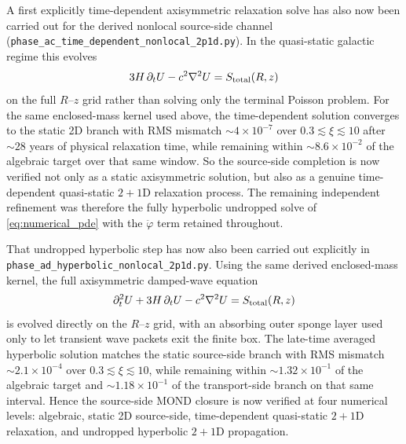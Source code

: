 \documentclass[11pt]{article}
\begin{document}
A first explicitly time-dependent axisymmetric relaxation solve has also now
been carried out for the derived nonlocal source-side channel
(\texttt{phase\_ac\_time\_dependent\_nonlocal\_2p1d.py}).  In the quasi-static
galactic regime this evolves
\[
3H\,\partial_t U-c^2\nabla^2U=S_{\rm total}(R,z)
\]
on the full $R$--$z$ grid rather than solving only the terminal Poisson
problem.  For the same enclosed-mass kernel used above, the time-dependent
solution converges to the static 2D branch with RMS mismatch
$\sim4\times10^{-7}$ over $0.3\lesssim\xi\lesssim10$ after $\sim 28$ years of
physical relaxation time, while remaining within $\sim8.6\times10^{-2}$ of the
algebraic target over that same window.  So the source-side completion is now
verified not only as a static axisymmetric solution, but also as a genuine
time-dependent quasi-static $2+1$D relaxation process.  The remaining
independent refinement was therefore the fully hyperbolic undropped solve of
\eqref{eq:numerical_pde} with the $\ddot{\varphi}$ term retained throughout.

That undropped hyperbolic step has now also been carried out explicitly in
\nolinkurl{phase_ad_hyperbolic_nonlocal_2p1d.py}.  Using the same derived
enclosed-mass kernel, the full axisymmetric damped-wave equation
\[
\partial_t^2 U + 3H\,\partial_t U - c^2\nabla^2 U = S_{\rm total}(R,z)
\]
is evolved directly on the $R$--$z$ grid, with an absorbing outer sponge layer
used only to let transient wave packets exit the finite box.  The late-time
averaged hyperbolic solution matches the static source-side branch with RMS
mismatch $\sim2.1\times10^{-4}$ over $0.3\lesssim\xi\lesssim10$, while remaining
within $\sim1.32\times10^{-1}$ of the algebraic target and
$\sim1.18\times10^{-1}$ of the transport-side branch on that same interval.
Hence the source-side MOND
closure is now verified at four numerical levels: algebraic, static 2D source-side,
time-dependent quasi-static $2+1$D relaxation, and undropped hyperbolic $2+1$D
propagation.
\end{document}
